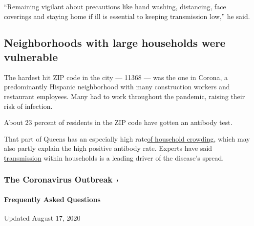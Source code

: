 ``Remaining vigilant about precautions like hand washing, distancing,
face coverings and staying home if ill is essential to keeping
transmission low,'' he said.

\hypertarget{neighborhoods-with-large-households-were-vulnerable}{%
\subsection{Neighborhoods with large households were
vulnerable}\label{neighborhoods-with-large-households-were-vulnerable}}

The hardest hit ZIP code in the city --- 11368 --- was the one in
Corona, a predominantly Hispanic neighborhood with many construction
workers and restaurant employees. Many had to work throughout the
pandemic, raising their risk of infection.

About 23 percent of residents in the ZIP code have gotten an antibody
test.

That part of Queens has an especially high
rate\href{https://www.nytimes3xbfgragh.onion/2016/03/01/nyregion/overcrowding-worsens-in-new-york-as-working-families-double-up.html}{of
household crowding}, which may also partly explain the high positive
antibody rate. Experts have said
\href{https://www.who.int/docs/default-source/coronaviruse/who-china-joint-mission-on-covid-19-final-report.pdf}{transmission}
within households is a leading driver of the disease's spread.

\href{https://www.nytimes3xbfgragh.onion/news-event/coronavirus?action=click\&pgtype=Article\&state=default\&region=MAIN_CONTENT_3\&context=storylines_faq}{}

\hypertarget{the-coronavirus-outbreak-}{%
\subsubsection{The Coronavirus Outbreak
›}\label{the-coronavirus-outbreak-}}

\hypertarget{frequently-asked-questions}{%
\paragraph{Frequently Asked
Questions}\label{frequently-asked-questions}}

Updated August 17, 2020

